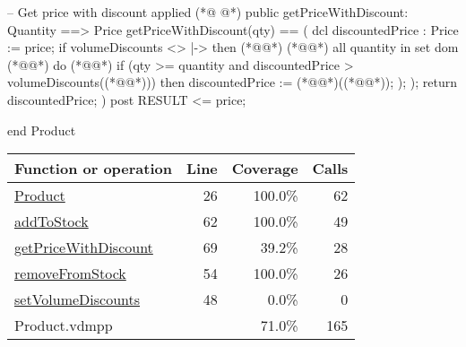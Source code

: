 \begin{vdmpp}[breaklines=true]
 -- Get price with discount applied
(*@
\label{getPriceWithDiscount:69}
@*)
 public getPriceWithDiscount: Quantity ==> Price 
 getPriceWithDiscount(qty) == (
  dcl discountedPrice : Price := price;
  if volumeDiscounts <> { |-> }
  then (*@\vdmnotcovered{(}@*)
   (*@@*) all quantity in set dom (*@@*)
    do (*@\vdmnotcovered{(}@*)
     if (qty >= quantity and discountedPrice > volumeDiscounts((*@@*)))
     then discountedPrice := (*@@*)((*@@*));
    );
   );
  return discountedPrice;
 )
 post RESULT <= price;

end Product
\end{vdmpp}
\bigskip
\begin{longtable}{|l|r|r|r|}
\hline
Function or operation & Line & Coverage & Calls \\
\hline
\hline
\hyperref[Product:26]{Product} & 26&100.0\% & 62 \\
\hline
\hyperref[addToStock:62]{addToStock} & 62&100.0\% & 49 \\
\hline
\hyperref[getPriceWithDiscount:69]{getPriceWithDiscount} & 69&39.2\% & 28 \\
\hline
\hyperref[removeFromStock:54]{removeFromStock} & 54&100.0\% & 26 \\
\hline
\hyperref[setVolumeDiscounts:48]{setVolumeDiscounts} & 48&0.0\% & 0 \\
\hline
\hline
Product.vdmpp & & 71.0\% & 165 \\
\hline
\end{longtable}

